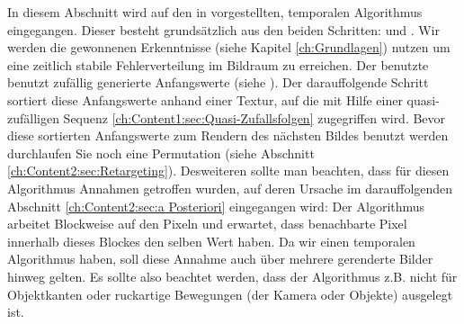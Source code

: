 In diesem Abschnitt wird auf den in \cite{hal02158423} vorgestellten, temporalen Algorithmus eingegangen.
Dieser besteht grundsätzlich aus den beiden Schritten:  und  
. Wir werden die gewonnenen Erkenntnisse (siehe Kapitel \ref{ch:Grundlagen})
nutzen um eine zeitlich stabile  Fehlerverteilung im Bildraum zu erreichen.
Der benutzte  benutzt zufällig generierte Anfangswerte 
(siehe \cite{matsumoto1998mersenne}). Der darauffolgende Schritt sortiert diese Anfangswerte anhand 
einer  Textur, auf die mit Hilfe einer quasi-zufälligen Sequenz 
\ref{ch:Content1:sec:Quasi-Zufallsfolgen} zugegriffen wird. Bevor diese sortierten Anfangswerte 
zum Rendern des nächsten Bildes benutzt werden durchlaufen Sie noch eine Permutation 
(siehe Abschnitt \ref{ch:Content2:sec:Retargeting}).
Desweiteren sollte man beachten, dass für diesen Algorithmus Annahmen getroffen wurden, auf deren Ursache im darauffolgenden 
Abschnitt \ref{ch:Content2:sec:a Posteriori} eingegangen wird:
Der Algorithmus arbeitet Blockweise auf den Pixeln und erwartet, dass benachbarte
Pixel innerhalb dieses Blockes den selben Wert haben. Da wir einen temporalen Algorithmus haben, soll diese Annahme 
auch über mehrere gerenderte Bilder hinweg gelten. Es sollte also beachtet werden, dass der Algorithmus z.B. nicht 
für Objektkanten oder ruckartige Bewegungen (der Kamera oder Objekte) ausgelegt ist.

